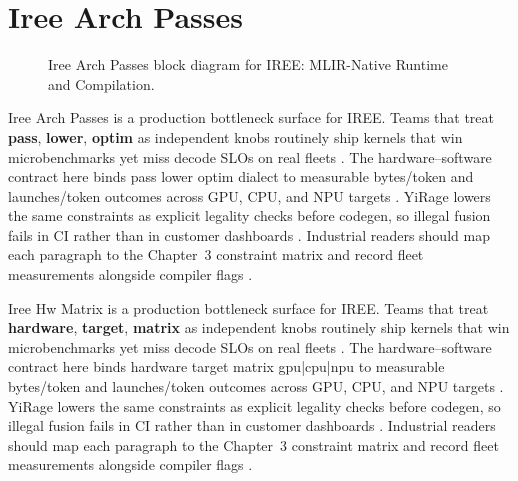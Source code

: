 \section{Iree Arch Passes}
\label{sec:iree_arch_passes}
\begin{figure}[t]
\centering
{}
\caption{Iree Arch Passes block diagram for IREE: MLIR-Native Runtime and Compilation.}
\label{fig:iree_arch_passes_architecture}
\end{figure}


Iree Arch Passes is a production bottleneck surface for IREE. Teams that treat \textbf{pass}, \textbf{lower}, \textbf{optim} as independent knobs routinely ship kernels that win microbenchmarks yet miss decode SLOs on real fleets \citep{taxbreak2026,semianalysis2024tma}. The hardware--software contract here binds pass lower optim dialect to measurable bytes/token and launches/token outcomes across GPU, CPU, and NPU targets \citep{memoryfloor2026,amd2024xdna}. YiRage lowers the same constraints as explicit legality checks before codegen, so illegal fusion fails in CI rather than in customer dashboards \citep{nvidia2022hopper,amd2024aie}. Industrial readers should map each paragraph to the Chapter~3 constraint matrix and record fleet measurements alongside compiler flags \citep{semianalysis2024tma,dlbook}.

Iree Hw Matrix is a production bottleneck surface for IREE. Teams that treat \textbf{hardware}, \textbf{target}, \textbf{matrix} as independent knobs routinely ship kernels that win microbenchmarks yet miss decode SLOs on real fleets \citep{liu2024deepseekv3,memoryfloor2026}. The hardware--software contract here binds hardware target matrix gpu|cpu|npu to measurable bytes/token and launches/token outcomes across GPU, CPU, and NPU targets \citep{patel2025llminference,nvidia2022hopper}. YiRage lowers the same constraints as explicit legality checks before codegen, so illegal fusion fails in CI rather than in customer dashboards \citep{taxbreak2026,semianalysis2024tma}. Industrial readers should map each paragraph to the Chapter~3 constraint matrix and record fleet measurements alongside compiler flags \citep{memoryfloor2026,amd2024xdna}.

